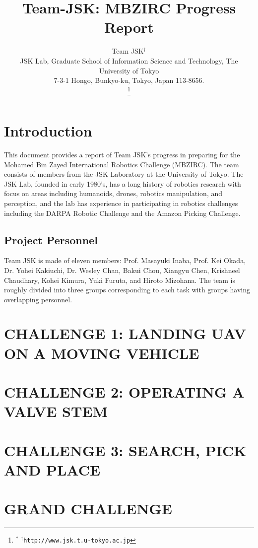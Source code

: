 \documentclass[letterpaper, 10 pt, conference]{ieeeconf}  %
\title{\LARGE \bf
  Team-JSK: MBZIRC Progress Report
}
\author{Team JSK$^\dagger$%
  \\ JSK Lab, Graduate School of Information Science and Technology, The University of Tokyo \\
  7-3-1 Hongo, Bunkyo-ku, Tokyo, Japan 113-8656.  \\
\thanks{$^{*}$ %
{$^\dagger$\tt\small http://www.jsk.t.u-tokyo.ac.jp}
}}
\begin{document}
\maketitle
\thispagestyle{empty}
\pagestyle{empty}


\section{Introduction}
This document provides a report of Team JSK's progress in preparing for the Mohamed Bin Zayed International Robotics Challenge (MBZIRC). The team consists of members from the JSK Laboratory at the University of Tokyo. The JSK Lab, founded in early 1980’s, has a long history of robotics research with focus on areas including humanoids, drones, robotics manipulation, and perception, and the lab has experience in participating in robotics challenges including the DARPA Robotic Challenge and the Amazon Picking Challenge.

\subsection{Project Personnel}
Team JSK is made of eleven members: Prof. Masayuki Inaba, Prof. Kei Okada, Dr. Yohei Kakiuchi, Dr. Wesley Chan, Bakui Chou, Xiangyu Chen, Krishneel Chaudhary, Kohei Kimura, Yuki Furuta, and Hiroto Mizohana. The team is roughly divided into three groups corresponding to each task with groups having overlapping personnel.




\section{CHALLENGE 1: LANDING UAV ON A MOVING VEHICLE}





\section{CHALLENGE 2: OPERATING A VALVE STEM}


\section{CHALLENGE 3: SEARCH, PICK AND PLACE}




\section{GRAND CHALLENGE}


\end{document}
